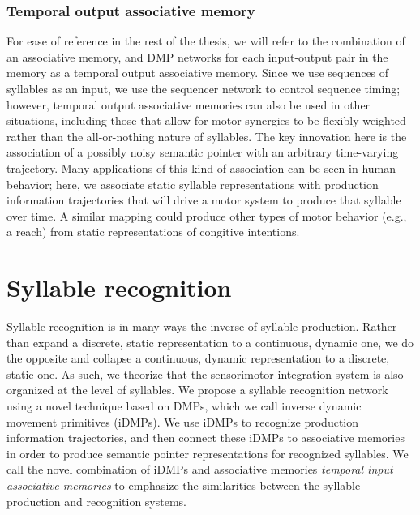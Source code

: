 
\subsubsection{Temporal output associative memory}

For ease of reference in the rest
of the thesis, we will refer to
the combination of an associative memory,
and DMP networks
for each input-output pair in the memory
as a temporal output associative memory.
Since we use sequences of syllables
as an input, we use the sequencer network
to control sequence timing;
however, temporal output associative memories
can also be used in other situations,
including those that allow for
motor synergies to be
flexibly weighted rather than
the all-or-nothing nature
of syllables.
The key innovation here is
the association of
a possibly noisy semantic pointer
with an arbitrary time-varying trajectory.
Many applications of this kind of association
can be seen in human behavior;
here, we associate static syllable representations
with production information trajectories
that will drive a motor system
to produce that syllable over time.
A similar mapping could produce
other types of motor behavior
(e.g., a reach)
from static representations
of congitive intentions.

\section{Syllable recognition}
\label{sec:impl-recog}


Syllable recognition is in many ways
the inverse of syllable production.
Rather than expand a discrete, static representation
to a continuous, dynamic one,
we do the opposite and collapse
a continuous, dynamic representation
to a discrete, static one.
As such, we theorize that the sensorimotor integration system
is also organized at the level of syllables.
We propose a syllable recognition network
using a novel technique based on DMPs,
which we call
inverse dynamic movement primitives
(iDMPs).
We use iDMPs to recognize production information trajectories,
and then connect these iDMPs
to associative memories
in order to produce semantic pointer representations
for recognized syllables.
We call the novel combination of
iDMPs and associative memories
\textit{temporal input associative memories}
to emphasize the similarities
between the syllable production
and recognition systems.

